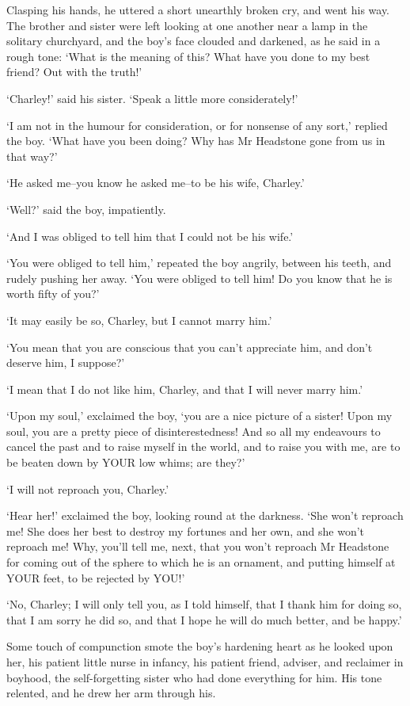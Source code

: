Clasping his hands, he uttered a short unearthly broken cry, and went
his way. The brother and sister were left looking at one another near
a lamp in the solitary churchyard, and the boy’s face clouded and
darkened, as he said in a rough tone: ‘What is the meaning of this? What
have you done to my best friend? Out with the truth!’

‘Charley!’ said his sister. ‘Speak a little more considerately!’

‘I am not in the humour for consideration, or for nonsense of any sort,’
replied the boy. ‘What have you been doing? Why has Mr Headstone gone
from us in that way?’

‘He asked me--you know he asked me--to be his wife, Charley.’

‘Well?’ said the boy, impatiently.

‘And I was obliged to tell him that I could not be his wife.’

‘You were obliged to tell him,’ repeated the boy angrily, between his
teeth, and rudely pushing her away. ‘You were obliged to tell him! Do
you know that he is worth fifty of you?’

‘It may easily be so, Charley, but I cannot marry him.’

‘You mean that you are conscious that you can’t appreciate him, and
don’t deserve him, I suppose?’

‘I mean that I do not like him, Charley, and that I will never marry
him.’

‘Upon my soul,’ exclaimed the boy, ‘you are a nice picture of a sister!
Upon my soul, you are a pretty piece of disinterestedness! And so all my
endeavours to cancel the past and to raise myself in the world, and to
raise you with me, are to be beaten down by YOUR low whims; are they?’

‘I will not reproach you, Charley.’

‘Hear her!’ exclaimed the boy, looking round at the darkness. ‘She won’t
reproach me! She does her best to destroy my fortunes and her own,
and she won’t reproach me! Why, you’ll tell me, next, that you won’t
reproach Mr Headstone for coming out of the sphere to which he is an
ornament, and putting himself at YOUR feet, to be rejected by YOU!’

‘No, Charley; I will only tell you, as I told himself, that I thank him
for doing so, that I am sorry he did so, and that I hope he will do much
better, and be happy.’

Some touch of compunction smote the boy’s hardening heart as he looked
upon her, his patient little nurse in infancy, his patient friend,
adviser, and reclaimer in boyhood, the self-forgetting sister who had
done everything for him. His tone relented, and he drew her arm through
his.

